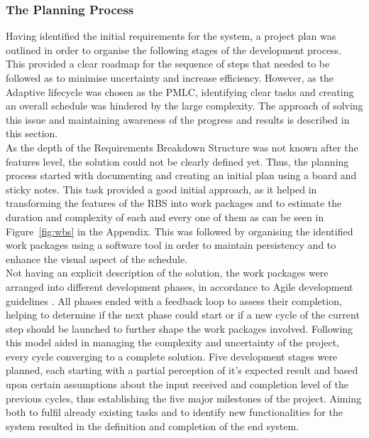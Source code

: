 \subsubsection{The Planning Process}
Having identified the initial requirements for the system, a project plan was outlined in order to organise the following stages of the development process. This provided a clear roadmap for the sequence of steps that needed to be followed as to minimise uncertainty and increase efficiency. However, as the Adaptive lifecycle was chosen as the PMLC, identifying clear tasks and creating an overall schedule was hindered by the large complexity. The approach of solving this issue and maintaining awareness of the progress and results is described in this section.\\

As the depth of the Requirements Breakdown Structure was not known after the features level, the solution could not be clearly defined yet. Thus, the planning process started with documenting and creating an initial plan using a board and sticky notes. This task provided a good initial approach, as it helped in transforming the features of the RBS into work packages and to estimate the duration and complexity of each and every one of them as can be seen in Figure~\ref{fig:wbs} in the Appendix. This was followed by organising the identified work packages using a software tool in order to maintain persistency and to enhance the visual aspect of the schedule.\\

Not having an explicit description of the solution, the work packages were arranged into different development phases, in accordance to Agile development guidelines \cite{wysocki_2013}. All phases ended with a feedback loop to assess their completion, helping to determine if the next phase could start or if a new cycle of the current step should be launched to further shape the work packages involved. Following this model aided in managing the complexity and uncertainty of the project, every cycle converging to a complete solution. Five development stages were planned, each starting with a partial perception of it's expected result and based upon certain assumptions about the input received and completion level of the previous cycles, thus establishing the five major milestones of the project. Aiming both to fulfil already existing tasks and to identify new functionalities for the system resulted in the definition and completion of the end system.\\

